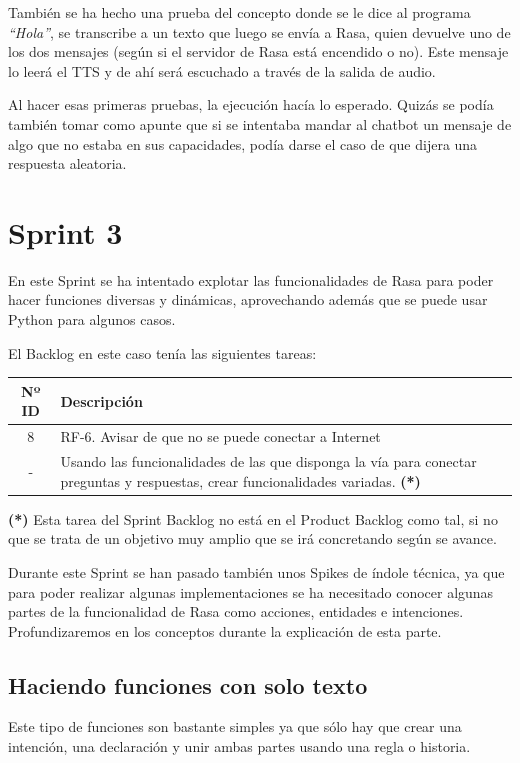 También se ha hecho una prueba del concepto donde se le dice al programa \textit{``Hola''}, se transcribe a un texto que luego se envía a Rasa, quien devuelve uno de los dos mensajes (según si el servidor de Rasa está encendido o no). Este mensaje lo leerá el TTS y de ahí será escuchado a través de la salida de audio. 

Al hacer esas primeras pruebas, la ejecución hacía lo esperado. Quizás se podía también tomar como apunte que si se intentaba mandar al chatbot un mensaje de algo que no estaba en sus capacidades, podía darse el caso de que dijera una respuesta aleatoria.

\section{Sprint 3}
En este Sprint se ha intentado explotar las funcionalidades de Rasa para poder hacer funciones diversas y dinámicas, aprovechando además que se puede usar Python para algunos casos.

El Backlog en este caso tenía las siguientes tareas:
\begin{table}[H]
	\begin{tabularx}{\textwidth}{|c|X|}
		\hline
		{\cellcolor{mintgreen}} \textbf{Nº ID} & {\cellcolor{mintgreen}} \textbf{Descripción} \\
		\hline
		8 & RF-6. Avisar de que no se puede conectar a Internet \\
		\hline
		- & Usando las funcionalidades de las que disponga la vía para conectar preguntas y respuestas, crear funcionalidades variadas. \textbf{(*)}\\
		\hline
	\end{tabularx}
\end{table}

\textbf{(*)} Esta tarea del Sprint Backlog no está en el Product Backlog como tal, si no que se trata de un objetivo muy amplio que se irá concretando según se avance.

Durante este Sprint se han pasado también unos Spikes \cite{spike} de índole técnica, ya que para  poder realizar algunas implementaciones se ha necesitado conocer algunas partes de la funcionalidad de Rasa como acciones, entidades e intenciones. Profundizaremos en los conceptos durante la explicación de esta parte.

\subsection{Haciendo funciones con solo texto}
Este tipo de funciones son bastante simples ya que sólo hay que crear una intención, una declaración y unir ambas partes usando una regla o historia.

